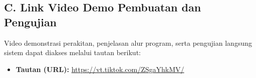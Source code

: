 \documentclass[12pt, a4paper]{article}
\begin{document}
\subsection*{C. Link Video Demo Pembuatan dan Pengujian}
Video demonstrasi perakitan, penjelasan alur program, serta pengujian langsung sistem dapat diakses melalui tautan berikut:
\begin{itemize}
    \item \textbf{Tautan (URL):} \url{https://vt.tiktok.com/ZSgaYhkMV/}
\end{itemize}
\end{document}
